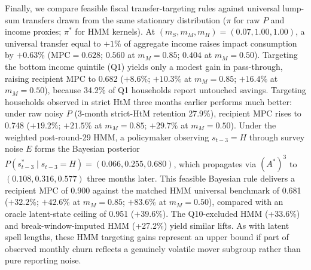 \documentclass[11pt]{article}
\begin{document}
Finally, we compare feasible fiscal transfer-targeting rules against universal lump-sum transfers drawn from the same stationary distribution ($\pi$ for raw $P$ and income proxies; $\pi^*$ for HMM kernels). At $(m_S, m_M, m_H) = (0.07, 1.00, 1.00)$, a universal transfer equal to $+1\%$ of aggregate income raises impact consumption by $+0.63\%$ ($\text{MPC} = 0.628$; $0.560$ at $m_M = 0.85$; $0.404$ at $m_M = 0.50$). Targeting the bottom income quintile (Q1) yields only a modest gain in pass-through, raising recipient MPC to 0.682 ($+8.6\%$; $+10.3\%$ at $m_M = 0.85$; $+16.4\%$ at $m_M = 0.50$), because 34.2\% of Q1 households report untouched savings. Targeting households observed in strict HtM three months earlier performs much better: under raw noisy $P$ (3-month strict-HtM retention 27.9\%), recipient MPC rises to 0.748 ($+19.2\%$; $+21.5\%$ at $m_M = 0.85$; $+29.7\%$ at $m_M = 0.50$). Under the weighted post-round-29 HMM, a policymaker observing $s_{t-3} = H$ through survey noise $E$ forms the Bayesian posterior $P(s^*_{t-3} \mid s_{t-3} = H) = (0.066, 0.255, 0.680)$, which propagates via $(A^*)^3$ to $(0.108, 0.316, 0.577)$ three months later. This feasible Bayesian rule delivers a recipient MPC of 0.900 against the matched HMM universal benchmark of 0.681 ($+32.2\%$; $+42.6\%$ at $m_M = 0.85$; $+83.6\%$ at $m_M = 0.50$), compared with an oracle latent-state ceiling of 0.951 ($+39.6\%$). The Q10-excluded HMM (+33.6\%) and break-window-imputed HMM (+27.2\%) yield similar lifts. As with latent spell lengths, these HMM targeting gains represent an upper bound if part of observed monthly churn reflects a genuinely volatile mover subgroup rather than pure reporting noise.
\end{document}
